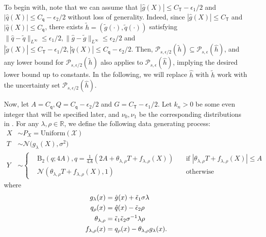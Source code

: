 \documentclass{article}
\def\eps{{\epsilon}}
\def\gN{{\mathcal{N}}}
\def\gP{{\mathcal{P}}}
\def\gX{{\mathcal{X}}}
\newcommand{\R}{\mathbb{R}}
\begin{document}
To begin with, note that we can assume that $|\hat{g}(X)|\leq C_{\mathsf{T}}-\eps_1/2$ and $|\hat{q}(X)|\leq C_{\mathsf{q}}-\eps_2/2$ without loss of generality. Indeed, since $|\hat{g}(X)|\leq C_{\mathsf{T}}$ and $|\hat{q}(X)|\leq C_{\mathsf{q}}$, there exists $\tilde{h}=(\tilde{g}(\cdot),\tilde{q}(\cdot))$ satisfying $\|\hat{q}-\tilde{q}\|_{L^{\infty}}\leq\eps_1/2, \|\hat{g}-\tilde{g}\|_{L^{\infty}}\leq\eps_2/2$ and $|\tilde{g}(X)|\leq C_{\mathsf{T}}-\eps_1/2, |\tilde{q}(X)|\leq C_{\mathsf{q}}-\eps_2/2$. Then, $\gP_{s,\eps/2}(\tilde{h})\subseteq\gP_{s,\eps}(\hat{h})$, and any lower bound for $\gP_{s,\eps/2}(\tilde{h})$ also applies to $\gP_{s,\eps}(\hat{h})$, implying the desired lower bound up to constants. In the following, we will replace $\hat{h}$ with $\tilde{h}$ work with the uncertainty set $\gP_{s,\eps/2}(\hat{h})$. 

Now, let $A = C_{\mathsf{q}}, Q = C_{\mathsf{q}}-\eps_2/2$ and $G = C_{\mathsf{T}}-\eps_1/2$. Let $k_n>0$ be some even integer that will be specified later, and $\nu_0,\nu_1$ be the corresponding distributions in . For any $\lambda,\rho\in\R$, we define the following data generating process:
\begin{equation}
    \label{eq:lambda-dgp}
    \begin{aligned}
        X &\sim P_X = \mathrm{Uniform}(\gX) \\
        T &\sim \gN\big(g_{\lambda}(X), \sigma^2\big) \\
        Y &\sim \left\{ 
        \begin{aligned}
            & \mathrm{B}_2(q;4A), q = \frac{1}{4A}\left(2A+\theta_{\lambda,\rho}T +  f_{\lambda,\rho}(X)\right) &\quad \text{if }   \left|\theta_{\lambda,\rho}T +  f_{\lambda,\rho}(X)\right| \leq A \\
            & \gN\left(\theta_{\lambda,\rho}T +  f_{\lambda,\rho}(X),1\right) &\quad \text{otherwise}
        \end{aligned}
        \right.
    \end{aligned}
\end{equation}
where
\begin{equation}
    \notag
    \begin{aligned}
        g_{\lambda}(x) &= \hat{g}(x)+\tilde{\eps}_1\sigma\lambda \\
        q_{\rho}(x) &= \hat{q}(x) - \tilde{\eps}_2\rho \\
        \theta_{\lambda,\rho} &= \tilde{\eps}_1\tilde{\eps}_2\sigma^{-1}\lambda\rho \\
        f_{\lambda,\rho}(x) &= q_{\rho}(x) - \theta_{\lambda,\rho}g_{\lambda}(x).
    \end{aligned}
\end{equation}
\end{document}
